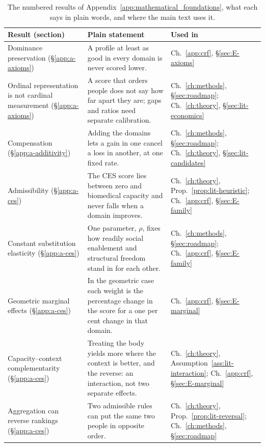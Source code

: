\begin{table}[htbp]\centering
\footnotesize
\caption{The numbered results of Appendix~\ref{app:mathematical_foundations}, what each says in plain words, and where the main text uses it.}
\label{tab:A-results}
\begin{tabular}{p{3.4cm}p{5.8cm}p{3.9cm}}
\toprule
Result (section) & Plain statement & Used in \\
\midrule
Dominance preservation (\S\ref{app:a-axioms}) & A profile at least as good in every domain is never scored lower. & Ch.~\ref{app:crf}, \S\ref{sec:E-axioms} \\
Ordinal representation is not cardinal measurement (\S\ref{app:a-axioms}) & A score that orders people does not say how far apart they are; gaps and ratios need separate calibration. & Ch.~\ref{ch:methods}, \S\ref{sec:roadmap}; Ch.~\ref{ch:theory}, \S\ref{sec:lit-economics} \\
Compensation (\S\ref{app:a-additivity}) & Adding the domains lets a gain in one cancel a loss in another, at one fixed rate. & Ch.~\ref{ch:methods}, \S\ref{sec:roadmap}; Ch.~\ref{ch:theory}, \S\ref{sec:lit-candidates} \\
Admissibility (\S\ref{app:a-ces}) & The CES score lies between zero and biomedical capacity and never falls when a domain improves. & Ch.~\ref{ch:theory}, Prop.~\ref{prop:lit-heuristic}; Ch.~\ref{app:crf}, \S\ref{sec:E-family} \\
Constant substitution elasticity (\S\ref{app:a-ces}) & One parameter, $\rho$, fixes how readily social enablement and structural freedom stand in for each other. & Ch.~\ref{ch:methods}, \S\ref{sec:roadmap}; Ch.~\ref{app:crf}, \S\ref{sec:E-family} \\
Geometric marginal effects (\S\ref{app:a-ces}) & In the geometric case each weight is the percentage change in the score for a one per cent change in that domain. & Ch.~\ref{app:crf}, \S\ref{sec:E-marginal} \\
Capacity--context complementarity (\S\ref{app:a-ces}) & Treating the body yields more where the context is better, and the reverse: an interaction, not two separate effects. & Ch.~\ref{ch:theory}, Assumption~\ref{ass:lit-interaction}; Ch.~\ref{app:crf}, \S\ref{sec:E-marginal} \\
Aggregation can reverse rankings (\S\ref{app:a-ces}) & Two admissible rules can put the same two people in opposite order. & Ch.~\ref{ch:theory}, Prop.~\ref{prop:lit-reversal}; Ch.~\ref{ch:methods}, \S\ref{sec:roadmap} \\

\end{tabular}
\end{table}
